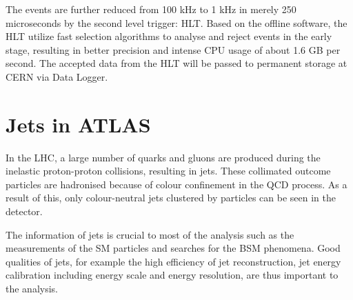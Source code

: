 \documentclass[UTF8,12pt]{ctexart}
\numberwithin{equation}{section}
\begin{document}
The events are further reduced from 100 kHz to 1 kHz in merely 250 microseconds by the second level trigger: HLT. Based on the offline software, the HLT utilize fast selection algorithms to analyse and reject events in the early stage, resulting in better precision and intense CPU usage of about 1.6 GB per second.  The accepted data from the HLT will be passed to permanent storage at CERN via Data Logger. 



\newpage
{}
\section{Jets in ATLAS}
\label{sec:4}


In the LHC, a large number of quarks and gluons are produced during the inelastic proton-proton collisions, resulting in jets. These collimated outcome particles are hadronised because of colour confinement in the QCD process. As a result of this, only colour-neutral jets clustered by particles can be seen in the detector.

The information of jets is crucial to most of the analysis such as the measurements of the SM particles and searches for the BSM phenomena. Good qualities of jets, for example the high efficiency of jet reconstruction, jet energy calibration including energy scale and energy resolution, are thus important to the analysis.





\end{document}
